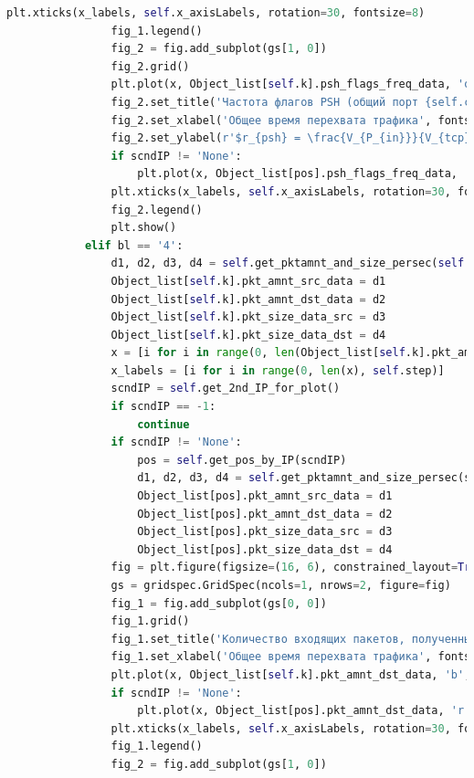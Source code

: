 \documentclass[bachelor, och, coursework]{SCWorks}
\begin{document}
\begin{lstlisting}[language=Python]
                plt.xticks(x_labels, self.x_axisLabels, rotation=30, fontsize=8)
                fig_1.legend()
                fig_2 = fig.add_subplot(gs[1, 0])
                fig_2.grid()
                plt.plot(x, Object_list[self.k].psh_flags_freq_data, 'orange', label=self.curIP)
                fig_2.set_title('Частота флагов PSH (общий порт {self.curPort})', fontsize=15 )
                fig_2.set_xlabel('Общее время перехвата трафика', fontsize=15)
                fig_2.set_ylabel(r'$r_{psh} = \frac{V_{P_{in}}}{V_{tcp}}$', fontsize=15)
                if scndIP != 'None':
                    plt.plot(x, Object_list[pos].psh_flags_freq_data, 'g', label=scndIP)
                plt.xticks(x_labels, self.x_axisLabels, rotation=30, fontsize=8)
                fig_2.legend()
                plt.show()
            elif bl == '4':
                d1, d2, d3, d4 = self.get_pktamnt_and_size_persec(self.curIP)
                Object_list[self.k].pkt_amnt_src_data = d1
                Object_list[self.k].pkt_amnt_dst_data = d2
                Object_list[self.k].pkt_size_data_src = d3
                Object_list[self.k].pkt_size_data_dst = d4
                x = [i for i in range(0, len(Object_list[self.k].pkt_amnt_src_data))]
                x_labels = [i for i in range(0, len(x), self.step)]
                scndIP = self.get_2nd_IP_for_plot()
                if scndIP == -1:
                    continue
                if scndIP != 'None':
                    pos = self.get_pos_by_IP(scndIP)
                    d1, d2, d3, d4 = self.get_pktamnt_and_size_persec(scndIP)
                    Object_list[pos].pkt_amnt_src_data = d1
                    Object_list[pos].pkt_amnt_dst_data = d2
                    Object_list[pos].pkt_size_data_src = d3
                    Object_list[pos].pkt_size_data_dst = d4
                fig = plt.figure(figsize=(16, 6), constrained_layout=True)
                gs = gridspec.GridSpec(ncols=1, nrows=2, figure=fig)
                fig_1 = fig.add_subplot(gs[0, 0])
                fig_1.grid()
                fig_1.set_title('Количество входящих пакетов, полученных за единицу времени (общий порт {self.curPort})', fontsize=15 )
                fig_1.set_xlabel('Общее время перехвата трафика', fontsize=15)
                plt.plot(x, Object_list[self.k].pkt_amnt_dst_data, 'b', label=self.curIP)
                if scndIP != 'None':
                    plt.plot(x, Object_list[pos].pkt_amnt_dst_data, 'r', label=scndIP)
                plt.xticks(x_labels, self.x_axisLabels, rotation=30, fontsize=8)
                fig_1.legend()
                fig_2 = fig.add_subplot(gs[1, 0])

\end{lstlisting}
\end{document}
